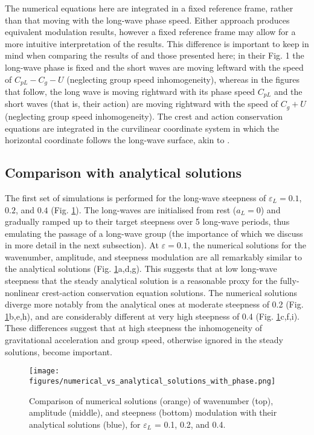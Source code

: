 \documentclass[lineno]{jfm}
\begin{document}
The numerical equations here are integrated in a fixed reference frame,
rather than that moving with the long-wave phase speed.
Either approach produces equivalent modulation results, however a fixed
reference frame may allow for a more intuitive interpretation of the results.
This difference is important to keep in mind when comparing the results
of \citet{peureux2021unsteady} and those presented here; in their Fig. 1 the
long-wave phase is fixed and the short waves are moving leftward
with the speed of $C_{pL} - C_g - U$ (neglecting group speed inhomogeneity),
whereas in the figures that follow, the long wave is moving rightward with its
phase speed $C_{pL}$ and the short waves (that is, their action) are moving
rightward with the speed of $C_g + U$ (neglecting group speed inhomogeneity).
The crest and action conservation equations are integrated in the curvilinear
coordinate system in which the horizontal coordinate follows the long-wave
surface, akin to \citet{zhang1990evolution}.

\subsection{Comparison with analytical solutions}
\label{subsection:comparison_with_analytical_solutions}

The first set of simulations is performed for the long-wave steepness of
$\varepsilon_L = 0.1$, $0.2$, and $0.4$ (Fig. \ref{fig:numerical_solutions}).
The long-waves are initialised from rest ($a_L = 0$) and gradually ramped up
to their target steepness over 5 long-wave periods, thus emulating the passage
of a long-wave group
(the importance of which we discuss in more detail in the next subsection).
At $\varepsilon = 0.1$, the numerical solutions for the wavenumber, amplitude,
and steepness modulation are all remarkably similar to the analytical solutions
(Fig. \ref{fig:numerical_solutions}a,d,g).
This suggests that at low long-wave steepness that the steady analytical solution
is a reasonable proxy for the fully-nonlinear crest-action conservation
equation solutions.
The numerical solutions diverge more notably from the analytical ones at
moderate steepness of 0.2 (Fig. \ref{fig:numerical_solutions}b,e,h), and are
considerably different at very high steepness of 0.4
(Fig. \ref{fig:numerical_solutions}c,f,i).
These differences suggest that at high steepness the inhomogeneity of
gravitational acceleration and group speed, otherwise ignored in the steady
solutions, become important.

\begin{figure}
\centering
\texttt{[image: figures/numerical\_vs\_analytical\_solutions\_with\_phase.png]}
\caption{
  Comparison of numerical solutions (orange) of wavenumber (top), amplitude
  (middle), and steepness (bottom) modulation with their analytical solutions
  (blue), for $\varepsilon_L$ = 0.1, 0.2, and 0.4.
}
\label{fig:numerical_solutions}
\end{figure}
\end{document}
